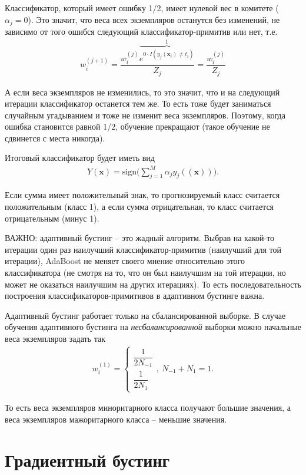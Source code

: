 \documentclass[%
	11pt,
	a4paper,
	utf8,
		]{article}
\begin{document}
Классификатор, который имеет ошибку 1/2, имеет нулевой вес в комитете ($ \alpha_j = 0 $). Это значит, что веса всех экземпляров останутся без изменений, не зависимо от того ошибся следующий классификатор-примитив или нет, т.е.
\begin{align*}
	w_i^{(j + 1)} = \dfrac{w_i^{(j)} \overbrace{e^{0\cdot I(y_j(\mathbf{x}_i) \neq t_i)}}^{1}}{Z_j} = \dfrac{ w_i^{(j)} }{Z_j}
\end{align*}

А если веса экземпляров не изменились, то это значит, что и на следующий итерации классификатор останется тем же. То есть тоже будет заниматься случайным угадыванием и тоже не изменит веса экземпляров. Поэтому, когда ошибка становится равной 1/2, обучение прекращают (такое обучение не сдвинется с места никогда).

Итоговый классификатор будет иметь вид
\begin{align*}
	Y(\mathbf{x}) = \text{sign} \Big( \sum_{j=1}^{M} \alpha_j y_j(\mathbf{(x)}) \Big).
\end{align*}

Если сумма имеет положительный знак, то прогнозируемый класс считается положительным (класс 1), а если сумма отрицательная, то класс считается отрицательным (минус 1).

ВАЖНО: адаптивный бустинг -- это жадный алгоритм. Выбрав на какой-то итерации один раз наилучший классификатор-примитив (наилучший для той итерации), AdaBoost не меняет своего мнение относительно этого классификатора (не смотря на то, что он был наилучшим на той итерации, но может не оказаться наилучшим на других итерациях). То есть последовательность построения классификаторов-примитивов в адаптивном бустинге важна.

Адаптивный бустинг работает только на сбалансированной выборке. В случае обучения адаптивного бустинга на \emph{несбалансированной} выборки можно начальные веса экземпляров задать так
\begin{align*}
	w_i^{(1)} = 
	\begin{cases}
		\dfrac{1}{2 N_{-1}}\\
		\dfrac{1}{ 2 N_{1}}
	\end{cases},\ N_{-1} + N_1 = 1.
\end{align*}

То есть веса экземпляров миноритарного класса получают большие значения, а веса экземпляров мажоритарного класса -- меньшие значения.


\section{Градиентный бустинг}
\end{document}
